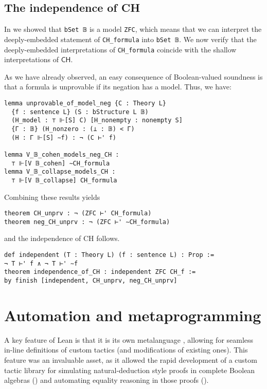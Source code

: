 \documentclass[sigplan,10pt,review, anonymous]{acmart}
\newcommand{\lil}{\lstinline}
\theoremstyle{definition}
\begin{document}


\subsection{The independence of CH} \label{subsect:forcing:independence}

In  we showed that \lil{bSet 𝔹} is a model \lil{ZFC},
which means that we can interpret the deeply-embedded statement of \lil{CH_formula} into
\lil{bSet 𝔹}.
We now verify that the deeply-embedded interpretations of \lil{CH_formula} coincide with the shallow interpretations of \(\mathsf{CH}\).

As we have already observed, an easy consequence of Boolean-valued soundness is that a formula is unprovable if its negation has a model. Thus, we have:
\begin{lstlisting}
lemma unprovable_of_model_neg {C : Theory L}
  {f : sentence L} (S : bStructure L 𝔹)
  (H_model : ⊤ ⊩[S] C) [H_nonempty : nonempty S]
  {Γ : 𝔹} (H_nonzero : (⊥ : 𝔹) < Γ)
  (H : Γ ⊩[S] ∼f) : ¬ (C ⊢' f)

lemma V_𝔹_cohen_models_neg_CH :
  ⊤ ⊩[V 𝔹_cohen] ∼CH_formula
lemma V_𝔹_collapse_models_CH :
  ⊤ ⊩[V 𝔹_collapse] CH_formula
\end{lstlisting}
\noindent Combining these results yields
\begin{lstlisting}
theorem CH_unprv : ¬ (ZFC ⊢' CH_formula)
theorem neg_CH_unprv : ¬ (ZFC ⊢' ∼CH_formula)
\end{lstlisting}
\noindent and the independence of CH follows.
\begin{lstlisting}
def independent (T : Theory L) (f : sentence L) : Prop :=
¬ T ⊢' f ∧ ¬ T ⊢' ∼f
theorem independence_of_CH : independent ZFC CH_f :=
by finish [independent, CH_unprv, neg_CH_unprv]
\end{lstlisting}
\section{Automation and metaprogramming}
\label{sect:metaprogramming}

A key feature of Lean is that it is its own metalanguage \cite{Ebner:2017:MFF:3136534.3110278}, allowing for seamless in-line definitions of custom tactics (and modifications of existing ones).
This feature was an invaluable asset, as it allowed the rapid development of a custom tactic library for simulating natural-deduction style proofs in complete Boolean algebras () and automating equality reasoning in those proofs ().
\end{document}
